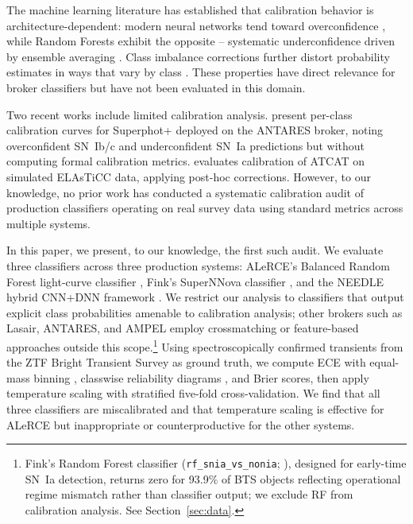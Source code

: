 \documentclass[a4paper,fleqn,usenatbib]{mnras}
\begin{document}
The machine learning literature has established that calibration behavior
is architecture-dependent: modern neural networks tend toward
overconfidence \citep{guo2017}, while Random Forests exhibit the
opposite -- systematic underconfidence driven by ensemble averaging
\citep{niculescumizil2005, bostrom2008}. Class imbalance corrections
further distort probability estimates in ways that vary by class
\citep{vandengoorbergh2022}. These properties have direct relevance for
broker classifiers but have not been evaluated in this domain.

Two recent works include limited calibration analysis.
\citet{desoto2024} present per-class calibration curves for Superphot+
deployed on the ANTARES broker, noting overconfident SN~Ib/c and
underconfident SN~Ia predictions but without computing formal calibration
metrics. \citet{tung2025} evaluates calibration of ATCAT on simulated
ELAsTiCC data, applying post-hoc corrections. However, to our knowledge,
no prior work has conducted a systematic calibration audit of production
classifiers operating on real survey data using standard metrics across
multiple systems.

In this paper, we present, to our knowledge, the first such audit.
We evaluate three classifiers across three production systems:
ALeRCE's Balanced Random Forest light-curve classifier
\citep[\texttt{lc\_classifier\_v1.1.13};][]{sanchezsaez2021},
Fink's SuperNNova classifier \citep{moller2020}, and the NEEDLE
hybrid CNN+DNN framework \citep{sheng2024}. We restrict our
analysis to classifiers that output explicit class probabilities
amenable to calibration analysis; other brokers such as Lasair,
ANTARES, and AMPEL employ crossmatching or feature-based approaches
outside this scope.\footnote{Fink's Random Forest classifier
(\texttt{rf\_snia\_vs\_nonia}; \citealt{leoni2022}), designed for
early-time SN~Ia detection, returns zero for 93.9\% of BTS objects
reflecting operational regime mismatch rather than classifier output;
we exclude RF from calibration analysis. See Section~\ref{sec:data}.}
Using spectroscopically confirmed transients from the ZTF Bright
Transient Survey \citep[BTS;][]{fremling2020, perley2020} as ground
truth, we compute ECE with equal-mass binning \citep{roelofs2022},
classwise reliability diagrams \citep{nixon2019}, and Brier scores,
then apply temperature scaling with stratified five-fold
cross-validation. We find that all three classifiers are miscalibrated
and that temperature scaling is effective for ALeRCE but inappropriate
or counterproductive for the other systems.
\end{document}
